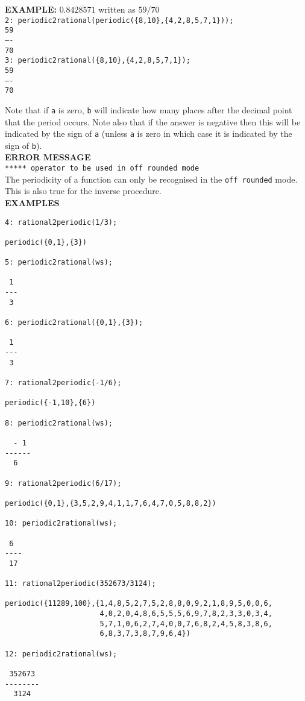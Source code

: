 \begin{tabbing}
\textbf{EXAMPLE:}
    \> $0.8\overline{428571}$ written as $59/70$ \\
    \> \texttt{2: periodic2rational(periodic(\{8,10\},\{4,2,8,5,7,1\}));}
\\[\baselineskip]
    \> \hspace{1mm} \texttt{59}\\
    \> \texttt{----}\\
    \> \hspace{1mm} \texttt{70}\\[\baselineskip]
    \> \texttt{3: periodic2rational(\{8,10\},\{4,2,8,5,7,1\});}
\\[\baselineskip]
    \> \hspace{1mm} \texttt{59}\\
    \> \texttt{----}\\
    \> \hspace{1mm} \texttt{70}
\end{tabbing}

Note that if \texttt{a} is zero, \texttt{b} will indicate how many places
after the decimal point that the period occurs. Note also that if the answer
is negative then this will be indicated by the sign of \texttt{a} (unless
\texttt{a} is zero in which case it is indicated by the sign of \texttt{b}).
\\[\baselineskip]
%
%
\textbf{ERROR MESSAGE}\\
%
\texttt{***** operator to be used in off rounded mode}\\
%
The periodicity of a function can only be recognised in
the \texttt{off rounded} mode. This is also true for the inverse
procedure.\\[\baselineskip]
%
%
{\large\bf EXAMPLES}
\begin{verbatim}
4: rational2periodic(1/3);

periodic({0,1},{3})

5: periodic2rational(ws);

 1
---
 3

6: periodic2rational({0,1},{3});

 1
---
 3

7: rational2periodic(-1/6);

periodic({-1,10},{6})

8: periodic2rational(ws);

  - 1
------
  6

9: rational2periodic(6/17);

periodic({0,1},{3,5,2,9,4,1,1,7,6,4,7,0,5,8,8,2})

10: periodic2rational(ws);

 6
----
 17

11: rational2periodic(352673/3124);

periodic({11289,100},{1,4,8,5,2,7,5,2,8,8,0,9,2,1,8,9,5,0,0,6,
                      4,0,2,0,4,8,6,5,5,5,6,9,7,8,2,3,3,0,3,4,
                      5,7,1,0,6,2,7,4,0,0,7,6,8,2,4,5,8,3,8,6,
                      6,8,3,7,3,8,7,9,6,4})

12: periodic2rational(ws);

 352673
--------
  3124

\end{verbatim}
